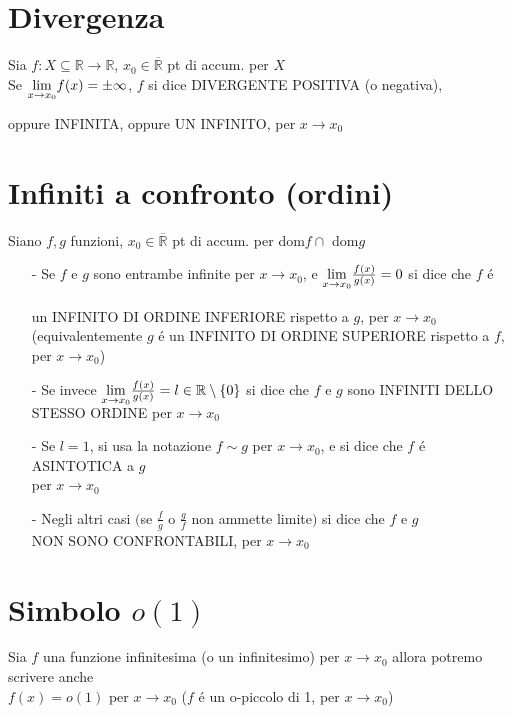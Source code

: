 \section{Divergenza}
Sia $f:X \subseteq \mathbb{R} \to \mathbb{R}$, $x_0 \in \overline{\mathbb{R}}$ pt di accum. per $X$ \\
Se $\smash{\displaystyle\lim_{x \to x_0}} f(x)=\pm \infty$, $f$ si dice DIVERGENTE POSITIVA (o negativa), \\
\\ 
oppure INFINITA, oppure UN INFINITO, per $x \to x_0$
\section{Infiniti a confronto (ordini)}
Siano $f,g$ funzioni, $x_0 \in \overline{\mathbb{R}}$ pt di accum. per dom$f \cap$ dom$g$
\begin{itemize}
\item[-]Se $f$ e $g$ sono entrambe infinite per $x \to x_0$, e $\smash{\displaystyle\lim_{x \to x_0}} \frac{f(x)}{g(x)}=0$ si dice che $f$ \'e \\
\\
un INFINITO DI ORDINE INFERIORE rispetto a $g$, per $x \to x_0$ \\
(equivalentemente $g$ \'e un INFINITO DI ORDINE SUPERIORE rispetto a $f$, per $x \to x_0$)
\item[-]Se invece $\smash{\displaystyle\lim_{x \to x_0}} \frac{f(x)}{g(x)}=l \in \mathbb{R} \setminus \{0\}$ si dice che $f$ e $g$ sono INFINITI DELLO STESSO ORDINE per $x \to x_0$
\item[-]Se $l=1$, si usa la notazione $f \sim g$ per $x \to x_0$, e si dice che $f$ \'e ASINTOTICA a $g$ \\
per $x \to x_0$
\item[-]Negli altri casi $\bigl($se $\frac{f}{g}$ o $\frac{g}{f}$ non ammette limite$\bigl)$ si dice che $f$ e $g$ \\
NON SONO CONFRONTABILI, per $x \to x_0$ 
\end{itemize}
\section{Simbolo $o(1)$ }
Sia $f$ una funzione infinitesima (o un infinitesimo) per $x \to x_0$ allora potremo scrivere anche \\
$f(x)=o(1)$ per $x \to x_0$ ($f$ \'e un o-piccolo di 1, per $x \to x_0$)
